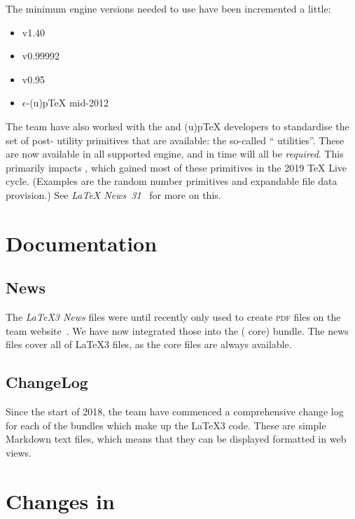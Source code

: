 \documentclass{ltnews}
\begin{document}
The minimum engine versions needed to use  have been
incremented a little:
\begin{itemize}
  \item {} v1.40
  \item {} v0.99992
  \item {} v0.95
  \item $\epsilon$-(u)p\TeX{} mid-2012
\end{itemize}

The team have also worked with the  and (u)p\TeX{} developers to
standardise the set of post-\eTeX{} utility primitives that are available: the
so-called \enquote{ utilities}. These are now available in all
supported engine, and in time will all be \emph{required}. This primarily
impacts , which gained most of these primitives in the 2019
\TeX{} Live cycle. (Examples are the random number primitives and expandable
file data provision.) See \emph{\LaTeX{} News~31}~\cite{12:site-news} for more on this.

\section{Documentation}

\subsection{News}

The \emph{\LaTeX3 News} files were until recently only used to create
\textsc{pdf} files on the team website~\cite{12:site}. We have now
integrated those into the  ( core)
bundle. The news files cover all of \LaTeX3 files, as the core files
are always available.

\subsection{ChangeLog}

Since the start of 2018, the team have commenced a comprehensive
change log for each of the bundles which make up the \LaTeX3 code.
These are simple Markdown text files, which means that they can be displayed
formatted in web views.

\section{Changes in }
\end{document}

